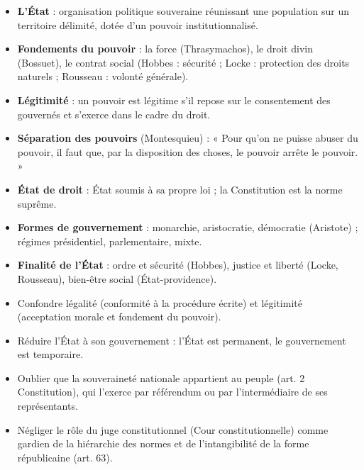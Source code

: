 \documentclass[11pt]{article}
\newcommand{\cle}[1]{{\popxbold\color{popdark}#1}}
\begin{document}
\begin{aretenir}
\begin{itemize}
\item \textbf{L'État} : organisation politique souveraine réunissant une \cle{population} sur un \cle{territoire} délimité, dotée d'un \cle{pouvoir} institutionnalisé.
\item \textbf{Fondements du pouvoir} : la force (Thrasymachos), le droit divin (Bossuet), le \cle{contrat social} (Hobbes : sécurité ; Locke : protection des droits naturels ; Rousseau : volonté générale).
\item \textbf{Légitimité} : un pouvoir est légitime s'il repose sur le consentement des gouvernés et s'exerce dans le cadre du droit.
\item \textbf{Séparation des pouvoirs} (Montesquieu) : « Pour qu'on ne puisse abuser du pouvoir, il faut que, par la disposition des choses, le pouvoir arrête le pouvoir. »
\item \textbf{État de droit} : État soumis à sa propre loi ; la Constitution est la norme suprême.
\item \textbf{Formes de gouvernement} : monarchie, aristocratie, démocratie (Aristote) ; régimes présidentiel, parlementaire, mixte.
\item \textbf{Finalité de l'État} : ordre et sécurité (Hobbes), justice et liberté (Locke, Rousseau), bien-être social (État-providence).
\end{itemize}
\end{aretenir}

\begin{attention}
\begin{itemize}
\item Confondre \cle{légalité} (conformité à la procédure écrite) et \cle{légitimité} (acceptation morale et fondement du pouvoir).
\item Réduire l'État à son gouvernement : l'État est permanent, le gouvernement est temporaire.
\item Oublier que la souveraineté nationale appartient au peuple (art. 2 Constitution), qui l'exerce par référendum ou par l'intermédiaire de ses représentants.
\item Négliger le rôle du juge constitutionnel (Cour constitutionnelle) comme gardien de la hiérarchie des normes et de l'intangibilité de la forme républicaine (art. 63).
\end{itemize}
\end{attention}
\end{document}
